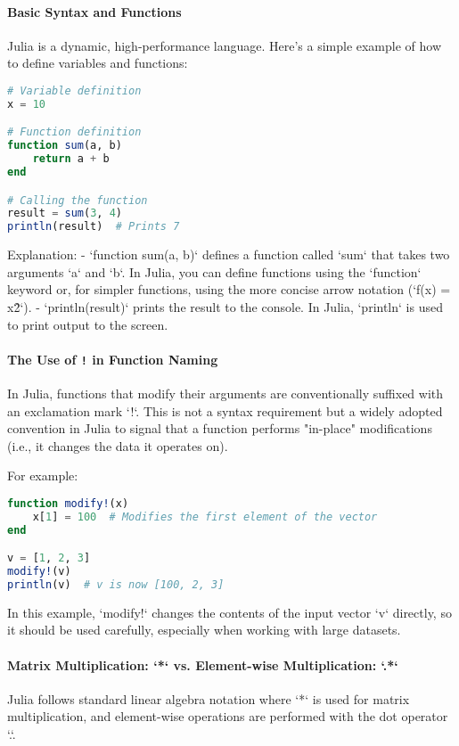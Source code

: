 \paragraph{Basic Syntax and Functions}
Julia is a dynamic, high-performance language. Here’s a simple example of how to define variables and functions:

\begin{lstlisting}[language=Julia]
# Variable definition
x = 10

# Function definition
function sum(a, b)
    return a + b
end

# Calling the function
result = sum(3, 4)
println(result)  # Prints 7
\end{lstlisting}

Explanation:
- `function sum(a, b)` defines a function called `sum` that takes two arguments `a` and `b`. In Julia, you can define functions using the `function` keyword or, for simpler functions, using the more concise arrow notation (`f(x) = x\^2`).
- `println(result)` prints the result to the console. In Julia, `println` is used to print output to the screen.

\paragraph{The Use of \texttt{!} in Function Naming}
In Julia, functions that modify their arguments are conventionally suffixed with an exclamation mark `!`. This is not a syntax requirement but a widely adopted convention in Julia to signal that a function performs "in-place" modifications (i.e., it changes the data it operates on).

For example:
\begin{lstlisting}[language=Julia]
function modify!(x)
    x[1] = 100  # Modifies the first element of the vector
end

v = [1, 2, 3]
modify!(v)
println(v)  # v is now [100, 2, 3]
\end{lstlisting}

In this example, `modify!` changes the contents of the input vector `v` directly, so it should be used carefully, especially when working with large datasets.

\paragraph{Matrix Multiplication: `*` vs. Element-wise Multiplication: `.*`}

Julia follows standard linear algebra notation where `*` is used for matrix multiplication, and element-wise operations are performed with the dot operator `.`.

